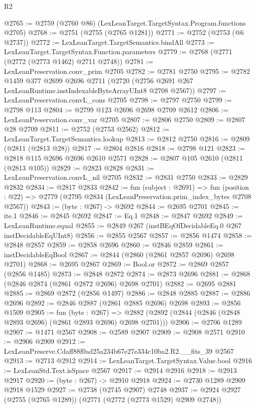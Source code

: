\begin{lexlean}{R2}
\begin{coremodule}
@2765 := @2759 (@2760 @86) (LexLeanTarget.TargetSyntax.Program.functions @2705)
@2768 := @2751 (@2755 (@2765 @1281))
@2771 := @2752 (@2753 (@6 @2737))
@2772 := LexLeanTarget.TargetSemantics.bindAll
@2773 := LexLeanTarget.TargetSyntax.Function.parameters
@2779 := @2768 (@2771 (@2772 (@2773 @1462) @2711 @2748))
@2781 := LexLeanPreservation.conv_prim @2705
@2782 := @2781 @2750
@2795 := @2782
    @1459
    @377
    @2699
    @2696
    @2711
    (@2720 (@2756 @2691 @267 LexLeanRuntime.instIndexableByteArrayUInt8 @2708 @2567))
@2797 := LexLeanPreservation.convL_cons @2705
@2798 := @2797 @2750
@2799 := @2798 @113
@2804 := @2799 @123 @2696 @2698 @2709 @2612
@2806 := LexLeanPreservation.conv_var @2705
@2807 := @2806 @2750
@2809 := @2807 @28 @2709
@2811 := @2752 (@2753 @2562)
@2812 := LexLeanTarget.TargetSemantics.lookup
@2813 := @2812 @2750
@2816 := @2809 (@2811 (@2813 @28))
@2817 := @2804 @2816
@2818 := @2798 @121
@2823 := @2818 @115 @2696 @2696 @2610 @2571
@2828 := @2807 @105 @2610 (@2811 (@2813 @105))
@2829 := @2823 @2828
@2831 := LexLeanPreservation.convL_nil @2705
@2832 := @2831 @2750
@2833 := @2829 @2832
@2834 := @2817 @2833
@2842 := fun (subject : @2691) =>
  fun (position : @22) => @2779 (@2795 @2834 (LexLeanPreservation.prim_index_bytes @2708 @2567))
@2843 := (byte : @267) -> @2692
@2844 := @2695 @2701
@2845 := ite.{1}
@2846 := @2845 @2692
@2847 := Eq.{1}
@2848 := @2847 @2692
@2849 := LexLeanRuntime.equal
@2855 := @2849 @267 (instBEqOfDecidableEq.{0} @267 instDecidableEqUInt8)
@2856 := @2855 @2567
@2857 := @2856 @1474
@2858 := @2848 @2857
@2859 := @2858 @2696
@2860 := @2846 @2859
@2861 := instDecidableEqBool
@2867 := @2844 (@2860 (@2861 @2857 @2696) @2698 @2701)
@2868 := @2695 @2867
@2869 := Bool.or
@2872 := @2869 @2857 (@2856 @1485)
@2873 := @2848 @2872
@2874 := @2873 @2696
@2881 := @2868 (@2846 @2874 (@2861 @2872 @2696) @2698 @2701)
@2882 := @2695 @2881
@2885 := @2869 @2872 (@2856 @1497)
@2886 := @2848 @2885
@2887 := @2886 @2696
@2892 := @2846 @2887 (@2861 @2885 @2696) @2698
@2893 := @2856 @1509
@2905 := fun (byte : @267) =>
  @2882 (@2892 (@2844 (@2846 (@2848 @2893 @2696) (@2861 @2893 @2696) @2698 @2701)))
@2906 := @2706 @1289
@2907 := @1471 @2567
@2908 := @2589 @2907
@2909 := @2908 @2571
@2910 := @2906 @2909
@2912 := LexLeanPreserve.Cdaff88f0ad25a234b67e27e334c10ba2.R2.__fits_39 @2567
@2913 := @2713 @2912
@2914 := LexLeanTarget.TargetSyntax.Value.bool
@2916 := LexLeanStd.Text.isSpace @2567
@2917 := @2914 @2916
@2918 := @2913 @2917
@2920 := (byte : @267) -> @2910 @2918
@2924 := @2730 @1289 @2909 @2918 @1529
@2927 := @2738 (@2745 @2907) @2748
@2937 := @2924 @2927 (@2755 (@2765 @1289)) (@2771 (@2772 (@2773 @1529) @2909 @2748))

\end{coremodule}
\end{lexlean}
